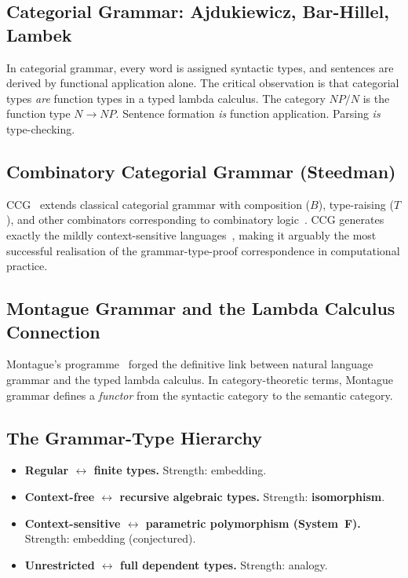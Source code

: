 \documentclass[12pt,a4paper]{article}
\begin{document}
\subsection{Categorial Grammar: Ajdukiewicz, Bar-Hillel, Lambek}

In categorial grammar, every word is assigned syntactic types, and sentences
are derived by functional application alone. The critical observation is that
categorial types \emph{are} function types in a typed lambda calculus.
The category $NP/N$ is the function type $N \to NP$. Sentence formation
\emph{is} function application. Parsing \emph{is} type-checking.

\subsection{Combinatory Categorial Grammar (Steedman)}

CCG~\cite{Steedman2000} extends classical categorial grammar with composition
($B$), type-raising ($T$), and other combinators corresponding to combinatory
logic~\cite{CurryFeys1958}. CCG generates exactly the mildly context-sensitive
languages~\cite{VijayShankerWeir1994}, making it arguably the most successful
realisation of the grammar-type-proof correspondence in computational practice.

\subsection{Montague Grammar and the Lambda Calculus Connection}

Montague's programme~\cite{Montague1970a,Montague1970b,Montague1973} forged
the definitive link between natural language grammar and the typed lambda
calculus. In category-theoretic terms, Montague grammar defines a
\emph{functor} from the syntactic category to the semantic category.

\subsection{The Grammar-Type Hierarchy}

\begin{itemize}
  \item \textbf{Regular $\leftrightarrow$ finite types.} Strength: embedding.
  \item \textbf{Context-free $\leftrightarrow$ recursive algebraic types.}
    Strength: \textbf{isomorphism}.
  \item \textbf{Context-sensitive $\leftrightarrow$ parametric polymorphism
    (System~F).} Strength: embedding (conjectured).
  \item \textbf{Unrestricted $\leftrightarrow$ full dependent types.}
    Strength: analogy.
\end{itemize}
\end{document}
